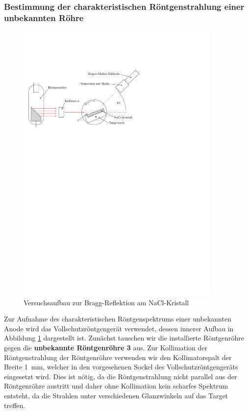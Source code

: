 \documentclass[10pt, a4paper]{article}
\begin{document}
\subsubsection{Bestimmung der charakteristischen Röntgenstrahlung einer unbekannten Röhre}
\begin{figure}[h]
\centering
\includegraphics[width=0.9\textwidth]{./grafiken/aufbau_bragg.pdf}
\caption{Versuchsaufbau zur Bragg-Reflektion am NaCl-Kristall}
\label{fig:bragg_aufbau}
\end{figure}
Zur Aufnahme des charakteristischen Röntgenspektrums einer unbekannten Anode wird das Vollschutzröntgengerät verwendet, dessen innerer Aufbau in Abbildung \ref{fig:bragg_aufbau} dargestellt ist.
Zunächst tauschen wir die installierte Röntgenröhre gegen die \textbf{unbekannte Röntgenröhre 3} aus.
Zur Kollimation der Röntgenstrahlung der Röntgenröhre verwenden wir den Kollimatorspalt der Breite \SI{1}{\milli\metre}, welcher in den vorgesehenen Sockel des Vollschutzröntgengeräts eingesetzt wird.
Dies ist nötig, da die Röntgenstrahlung nicht parallel aus der Röntgenröhre austritt und daher ohne Kollimation kein scharfes Spektrum entsteht, da die Strahlen unter verschiedenen Glanzwinkeln auf das Target treffen.
\end{document}
